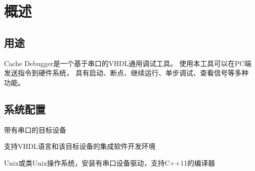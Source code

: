 \section{概述}
    \subsection{用途}
        Cache Debugger是一个基于串口的VHDL通用调试工具。%
        使用本工具可以在PC端发送指令到硬件系统，%
        具有启动、断点、继续运行、单步调试、查看信号等多种功能。%

    \subsection{系统配置}
        带有串口的目标设备
        
        支持VHDL语言和该目标设备的集成软件开发环境

        Unix或类Unix操作系统，安装有串口设备驱动，支持C++11的编译器

    
